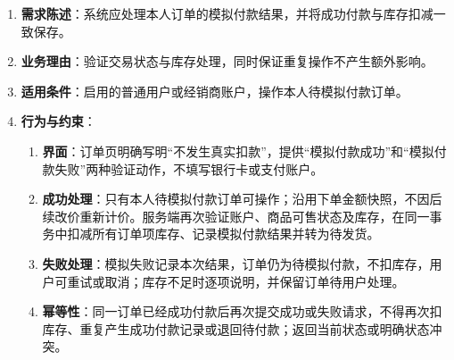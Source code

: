 \begin{enumerate}
\item {\bfseries 需求陈述}：系统应处理本人订单的模拟付款结果，并将成功付款与库存扣减一致保存。
\item {\bfseries 业务理由}：验证交易状态与库存处理，同时保证重复操作不产生额外影响。
\item {\bfseries 适用条件}：启用的普通用户或经销商账户，操作本人待模拟付款订单。
\item {\bfseries 行为与约束}：
\begin{enumerate}
\item {\bfseries 界面}：订单页明确写明“不发生真实扣款”，提供“模拟付款成功”和“模拟付款失败”两种验证动作，不填写银行卡或支付账户。
\item {\bfseries 成功处理}：只有本人待模拟付款订单可操作；沿用下单金额快照，不因后续改价重新计价。服务端再次验证账户、商品可售状态及库存，在同一事务中扣减所有订单项库存、记录模拟付款结果并转为待发货。
\item {\bfseries 失败处理}：模拟失败记录本次结果，订单仍为待模拟付款，不扣库存，用户可重试或取消；库存不足时逐项说明，并保留订单待用户处理。
\item {\bfseries 幂等性}：同一订单已经成功付款后再次提交成功或失败请求，不得再次扣库存、重复产生成功付款记录或退回待付款；返回当前状态或明确状态冲突。
\end{enumerate}

\end{enumerate}


